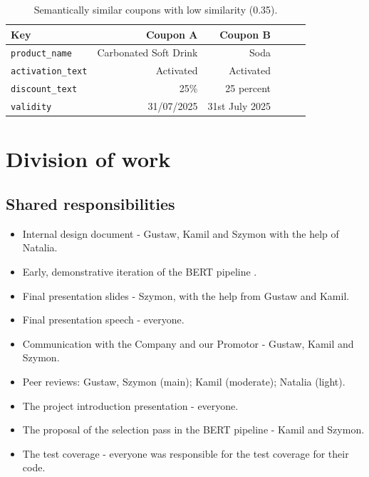 \documentclass[licencjacka,en]{pracamgr}
\begin{document}
\begin{table}[h!]
\centering
\setlength{\tabcolsep}{4pt}
\small %
\begin{tabular}{|l|r|r|r|r|r|}
\hline
\textbf{Key} & \textbf{Coupon A} & \textbf{Coupon B} \\
\midrule
\texttt{product\_name}       & Carbonated Soft Drink     & Soda                    \\
\texttt{activation\_text}    & Activated                 & Activated      \\
\texttt{discount\_text}      & 25\%                      & 25 percent \\
\texttt{validity}           & 31/07/2025                & 31st July 2025  \\
\hline
\end{tabular}
\caption{Semantically similar coupons with low similarity (0.35).}
\label{tab:json-comparison}
\end{table}

\chapter{Division of work}
\section{Shared responsibilities}
\begin{itemize}
    \item Internal design document - Gustaw, Kamil and Szymon with the help of Natalia.
    \item Early, demonstrative iteration of the BERT pipeline .
    \item Final presentation slides - Szymon, with the help from Gustaw and Kamil.
    \item Final presentation speech - everyone.
    \item Communication with the Company and our Promotor - Gustaw, Kamil and Szymon.
    \item Peer reviews: Gustaw, Szymon (main); Kamil (moderate); Natalia (light).
    \item The project introduction presentation - everyone.
    \item The proposal of the selection pass in the BERT pipeline - Kamil and Szymon.
    \item The test coverage - everyone was responsible for the test coverage for their code.
\end{itemize}
\end{document}

